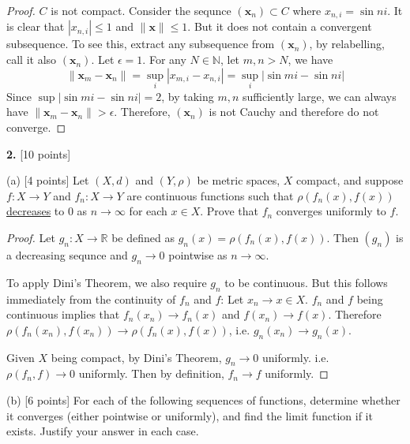 \documentclass[11pt,a4paper]{amsart}
\def\R{{\mathbb R}}
\def\N{{\mathbb N}}
\def\e{\epsilon}
\def\r{\rho}
\def\ra{\rightarrow}
\begin{document}
\begin{itemize}
  \begin{proof}
    $C$ is not compact. Consider the sequnce $(\bm x_{n})\subset C$ where $x_{n,i} = \sin ni$.
     It is clear that $|x_{n,i}| \le 1$ and $\|\bm x\|\le 1$. But it does not contain a convergent subsequence.
     To see this, extract any subsequence from  $(\bm x_{n})$, by relabelling, call it also  $(\bm x_{n})$.
     Let $\e = 1$. For any $N\in\N$, let $m,n>N$, we have
     $$ \| \bm x_m - \bm x_n \| = \sup_{i} |x_{m,i} - x_{n,i}| = \sup_{i} |\sin mi - \sin ni| $$
     Since $\sup |\sin mi - \sin ni| = 2$, by taking $m,n$ sufficiently large, we can always
     have $\| \bm x_m - \bm x_n \| > \e$.
     Therefore, $(\bm x_n)$ is not Cauchy and therefore do not converge.
  \end{proof}
\end{itemize}



\bigskip


{\bf 2.} [10 points]

(a) [4 points] Let $(X,d)$ and $(Y,\r)$ be metric spaces, $X$ compact, and suppose  $f:X\rightarrow Y$ and
$f_n:X \rightarrow Y$ are continuous functions such that $\r(f_n(x),f(x))$ \underline{decreases}
to $0$ as $n\ra \infty$ for each $x\in X$. Prove that $f_n$ converges uniformly to $f$.


\begin{proof}
  Let $g_n: X\to\R$ be defined as $g_n(x) = \rho(f_n(x),f(x))$.
  Then $(g_n)$ is a decreasing sequnce and $g_n \to 0$ pointwise as $n\to\infty$.

  To apply Dini's Theorem, we also require $g_n$ to be continuous.
  But this follows immediately from the continuity of $f_n$ and $f$:
  Let $x_n \to x \in X$. $f_n$ and $f$ being continuous implies that
  $f_n(x_n) \to f_n(x)$ and $f(x_n) \to f(x)$.
  Therefore $\rho(f_n(x_n),f(x_n)) \to \rho(f_n(x),f(x))$,
  i.e. $g_n(x_n) \to g_n(x)$.

  Given $X$ being compact, by Dini's Theorem, $g_n \to 0$ uniformly. i.e.\\
  $\rho(f_n,f) \to 0$ uniformly. Then by definition, $f_n \to f$ uniformly.
\end{proof}
\medskip

(b) [6 points] For each of the following sequences of functions, determine whether it converges
(either pointwise or uniformly), and find the limit function if it exists.
Justify your answer in each case.
\end{document}
